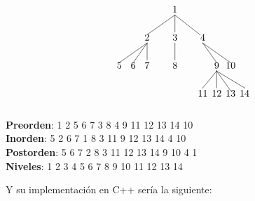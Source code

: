\documentclass[10pt,a4paper,spanish]{report}
\begin{document}
\begin{minipage}{0.6\textwidth}
\begin{flushleft}
\[\begin{xy}
,(0,0)*+=<10mm>[]\txt<2cm>{1}
,(-10,-10)*+=<10mm>[]\txt<2cm>{2}
,(0,-10)*+=<10mm>[]\txt<2cm>{3}
,(10,-10)*+=<10mm>[]\txt<2cm>{4}
,(-20,-20)*+=<10mm>[]\txt<2cm>{5}
,(-15,-20)*+=<10mm>[]\txt<2cm>{6}
,(-10,-20)*+=<10mm>[]\txt<2cm>{7}
,(0,-20)*+=<10mm>[]\txt<2cm>{8}
,(15,-20)*+=<10mm>[]\txt<2cm>{9}
,(20,-20)*+=<10mm>[]\txt<2cm>{10}
,(10,-30)*+=<10mm>[]\txt<2cm>{11}
,(15,-30)*+=<10mm>[]\txt<2cm>{12}
,(20,-30)*+=<10mm>[]\txt<2cm>{13}
,(25,-30)*+=<10mm>[]\txt<2cm>{14}

\ar@{-} (0,-2);(-10,-9) %
\ar@{-} (0,-2);(0,-8) %
\ar@{-} (0,-2);(9,-9) %
\ar@{-} (-10,-12);(-20,-19) %
\ar@{-} (-10,-12);(-15,-19) %
\ar@{-} (-10,-12);(-10,-18) %
\ar@{-} (0,-12);(0,-18) %
\ar@{-} (10,-12);(15,-19) %
\ar@{-} (10,-12);(20,-19) %
\ar@{-} (15,-22);(10,-28) %
\ar@{-} (15,-22);(15,-28) %
\ar@{-} (15,-22);(20,-29) %
\ar@{-} (15,-22);(25,-28) %
\end{xy}\]
\end{flushleft}
\end{minipage}
\begin{minipage}{0.6\textwidth}
\begin{flushleft}
\textbf{\textcolor[rgb]{0.3,0.4,0.8}{Preorden}}: 1 2 5 6 7 3 8 4 9 11 12 13 14 10 \\
\textbf{\textcolor[rgb]{0.3,0.4,0.8}{Inorden}}: 5 2 6 7 1 8 3 11 9 12 13 14 4 10 \\
\textbf{\textcolor[rgb]{0.3,0.4,0.8}{Postorden}}: 5 6 7 2 8 3 11 12 13 14 9 10 4 1 \\
\textbf{\textcolor[rgb]{0.3,0.4,0.8}{Niveles}}: 1 2 3 4 5 6 7 8 9 10 11 12 13 14 \\
\end{flushleft}
\end{minipage}

\noindent
Y su implementación en C++ sería la siguiente:
\end{document}
